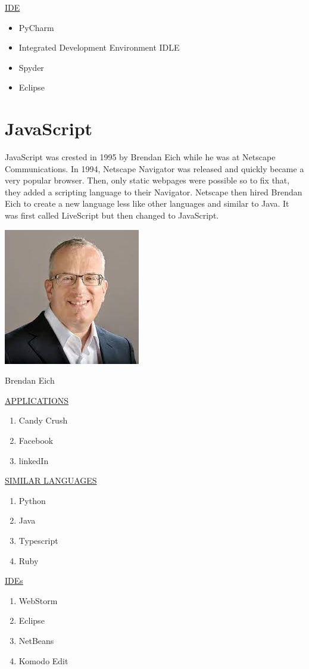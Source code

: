 \documentclass{article}
\begin{document}
\underline{IDE}

\begin{itemize}
	\item PyCharm
	\item Integrated Development Environment {IDLE}
	\item Spyder
	\item Eclipse
\end{itemize}

\newpage
\section{\textbf{JavaScript}}
JavaScript was crested in 1995 by Brendan Eich while he was at Netscape Communications.
In 1994, Netscape Navigator was released and quickly became a very popular browser. Then, only static webpages were possible so to fix that, they added a scripting language to their Navigator. 
Netscape then hired Brendan Eich to create a new language less like other languages and similar to Java. It was first called LiveScript but then changed to JavaScript.

\newpage
\includegraphics{Brendan Eich.jpg}
\caption{Brendan Eich}
\newpage
\underline{APPLICATIONS}
\begin{enumerate}
	\item Candy Crush
\item Facebook 
\item linkedIn
\end{enumerate}

\underline{SIMILAR LANGUAGES}
\begin{enumerate}
	\item Python
	\item Java
	\item Typescript
	\item Ruby
\end{enumerate}

\underline{IDEs}
\begin{enumerate}
	\item WebStorm
    \item Eclipse
	\item NetBeans
	\item Komodo Edit
	\end{enumerate}
\end{document}
